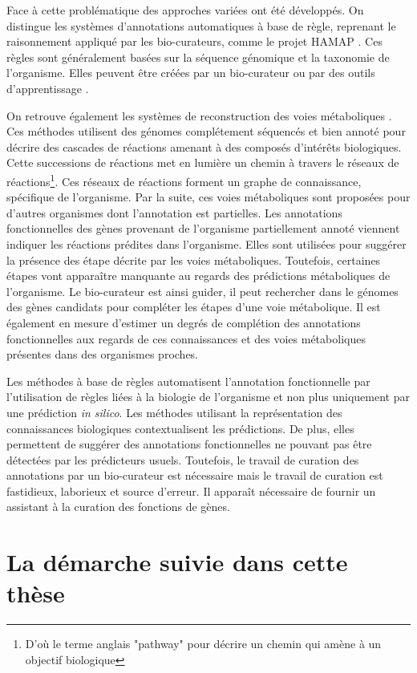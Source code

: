\begin{refsegment}
Face à cette problématique des approches variées ont été développés. On distingue les systèmes d'annotations automatiques à base de règle, reprenant le raisonnement appliqué par les bio-curateurs, comme le projet \gls{HAMAP} \cite{lima2009hamap}. Ces règles sont généralement basées sur la séquence génomique et la taxonomie de l'organisme. Elles peuvent être créées par un bio-curateur ou par des outils d'apprentissage \cite{uniprot2011ongoing}.

On retrouve également les systèmes de reconstruction des voies métaboliques \cite{karpe2011pathway}. Ces méthodes utilisent des génomes complétement séquencés et bien annoté pour décrire des cascades de réactions amenant à des composés d'intérêts biologiques.  Cette successions de réactions met en lumière un chemin à travers le réseaux de réactions\footnote{D'où le terme anglais "pathway" pour décrire un chemin qui amène à un objectif biologique}. Ces réseaux de réactions forment un graphe de connaissance, spécifique de l'organisme. Par la suite, ces voies métaboliques sont proposées pour d'autres organismes dont l'annotation est partielles. Les annotations fonctionnelles des gènes provenant de l'organisme partiellement annoté  viennent indiquer les réactions prédites dans l'organisme. Elles sont utilisées pour suggérer la présence des étape décrite par les voies métaboliques. Toutefois, certaines étapes  vont apparaître manquante au regards des prédictions métaboliques de l'organisme. Le bio-curateur est ainsi guider, il peut rechercher dans le génomes des gènes candidats pour compléter les étapes d'une voie métabolique. Il est également en mesure d'estimer un degrés de complétion des annotations fonctionnelles aux regards de ces connaissances et des voies métaboliques présentes dans des organismes proches.

Les méthodes à base de règles automatisent l'annotation fonctionnelle par l'utilisation de règles liées à la biologie de l'organisme et non plus uniquement par une prédiction \textit{in silico}. Les méthodes utilisant la représentation des connaissances biologiques contextualisent les prédictions. De plus, elles permettent de suggérer des annotations fonctionnelles ne pouvant pas être détectées par les prédicteurs usuels. Toutefois, le travail de curation des annotations par un bio-curateur est nécessaire mais le travail de curation est fastidieux, laborieux et source d'erreur. Il apparaît nécessaire de fournir un assistant à la curation des fonctions de gènes.

\section*{La démarche suivie dans cette thèse}


\end{refsegment}
